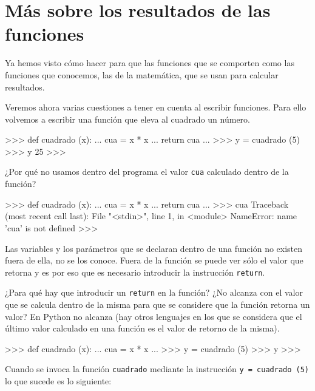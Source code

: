 
\section{Más sobre los resultados de las funciones}

Ya hemos visto cómo hacer para que las funciones que se comporten como las
funciones que conocemos, las de la matemática, que
se usan para calcular resultados.

Veremos ahora varias cuestiones a tener en cuenta al escribir
funciones. Para ello volvemos a escribir una función que eleva al cuadrado un número.

\begin{codigo-python-sn}
>>> def cuadrado (x):
...         cua = x * x
...         return cua
...
>>> y = cuadrado (5)
>>> y
25
>>>
\end{codigo-python-sn}

¿Por qué no usamos dentro del programa el valor \verb+cua+ calculado dentro de
la función?

\begin{codigo-python-sn}
>>> def cuadrado (x):
...     cua = x * x
...     return cua
...
>>> cua
Traceback (most recent call last):
  File "<stdin>", line 1, in <module>
NameError: name 'cua' is not defined
>>>
\end{codigo-python-sn}

\begin{observacion}
Las variables y los parámetros que se declaran
dentro de una función no existen fuera de ella, no se los conoce.
Fuera de la función se puede ver sólo el valor que retorna 
y es por eso que es necesario introducir la instrucción \lstinline!return!.
\end{observacion}

¿Para qué hay que introducir un \lstinline+return+ en la función?
¿No alcanza con el valor que se calcula dentro de la misma
para que se considere que la función retorna un valor? En
Python no alcanza (hay otros lenguajes en los que se considera que el
último valor calculado en una función es el valor de retorno de la misma).

\begin{codigo-python-sn}
>>> def cuadrado (x):
...     cua = x * x
...
>>> y = cuadrado (5)
>>> y
>>>
\end{codigo-python-sn}

Cuando se invoca la función \lstinline!cuadrado! mediante la instrucción
\verb+y = cuadrado (5)+ lo que sucede es lo siguiente:


